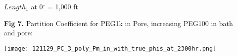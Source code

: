 \documentclass[12pt]{article}
\begin{document}
\begin{itemize}
                $Length_{1}$ at 0$^{\circ}$ = 1,000 ft \\

        \item[\bf{Fig 7.}] Partition Coefficient for PEG1k in Pore, increasing PEG100 in bath and pore:\\
		\centerline{\texttt{[image: 121129\_PC\_3\_poly\_Pm\_in\_with\_true\_phis\_at\_2300hr.png]}}

%
%
%
%
%
%
%
%		

\end{itemize}
\end{document}

